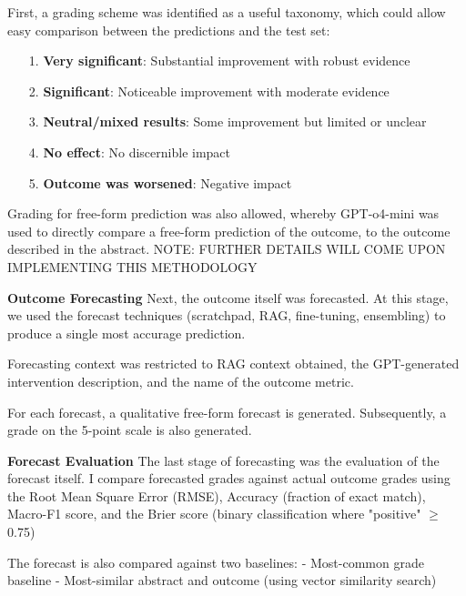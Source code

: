 \documentclass[12pt,a4paper]{article}
\begin{document}
First, a grading scheme was identified as a useful taxonomy, which could allow easy comparison between the predictions and the test set:
\begin{itemize}
\item [1.] \textbf{Very significant}: Substantial improvement with robust evidence
\item [2.] \textbf{Significant}: Noticeable improvement with moderate evidence
\item [3.] \textbf{Neutral/mixed results}: Some improvement but limited or unclear
\item [4.] \textbf{No effect}: No discernible impact
\item [5.] \textbf{Outcome was worsened}: Negative impact
\end{itemize}

Grading for free-form prediction was also allowed, whereby GPT-o4-mini was used to directly compare a free-form prediction of the outcome, to the outcome described in the abstract. NOTE: FURTHER DETAILS WILL COME UPON IMPLEMENTING THIS METHODOLOGY %

\textbf{Outcome Forecasting}
Next, the outcome itself was forecasted. At this stage, we used the forecast techniques (scratchpad, RAG, fine-tuning, ensembling) to produce a single most accurage prediction.

Forecasting context was restricted to RAG context obtained, the GPT-generated intervention description, and the name of the outcome metric.

For each forecast, a qualitative free-form forecast is generated. Subsequently, a grade on the 5-point scale is also generated.

\textbf{Forecast Evaluation}
The last stage of forecasting was the evaluation of the forecast itself. I compare forecasted grades against actual outcome grades using the Root Mean Square Error (RMSE), Accuracy (fraction of exact match), Macro-F1 score, and the Brier score (binary classification where "positive" $\ge$ 0.75)

The forecast is also compared against two baselines:
- Most-common grade baseline
- Most-similar abstract and outcome (using vector similarity search)
\end{document}
